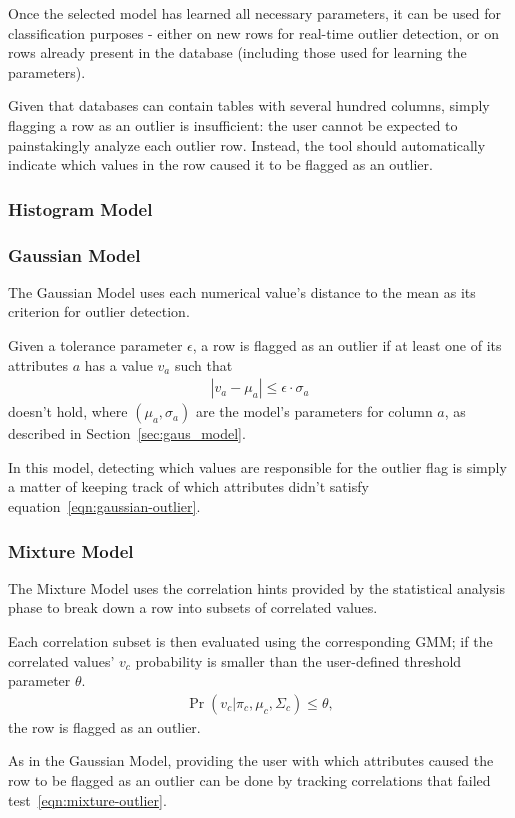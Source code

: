 Once the selected model has learned all necessary parameters, it can be used for classification purposes - either on new rows for real-time outlier detection, or on rows already present in the database (including those used for learning the parameters).

Given that databases can contain tables with several hundred columns, simply flagging a row as an outlier is insufficient: the user cannot be expected to painstakingly analyze each outlier row. Instead, the tool should automatically indicate which values in the row caused it to be flagged as an outlier.

\subsubsection{Histogram Model}
\subsubsection{Gaussian Model}
The Gaussian Model uses each numerical value's distance to the mean as its criterion for outlier detection. 

Given a tolerance parameter $\epsilon$, a row is flagged as an outlier if at least one of its attributes $a$ has a value $v_a$ such that 
\begin{align}
  |v_a - \mu_a| \leq \epsilon \cdot \sigma_a
  \label{eqn:gaussian-outlier}
\end{align}
doesn't hold, where $(\mu_a, \sigma_a)$ are the model's parameters for column $a$, as described in Section~\ref{sec:gaus_model}.

In this model, detecting which values are responsible for the outlier flag is simply a matter of keeping track of which attributes didn't satisfy equation~\ref{eqn:gaussian-outlier}.
 
\subsubsection{Mixture Model}
The Mixture Model uses the correlation hints provided by the statistical analysis phase to break down a row into subsets of correlated values.

Each correlation subset is then evaluated using the corresponding GMM; if the correlated values' $v_c$ probability is smaller than the user-defined threshold parameter $\theta$.
\begin{align}
  \Pr(v_c | \pi_c, \mu_c, \Sigma_c) \leq \theta, 
  \label{eqn:mixture-outlier}
\end{align}
the row is flagged as an outlier.

As in the Gaussian Model, providing the user with which attributes caused the row to be flagged as an outlier can be done by tracking correlations that failed test~\ref{eqn:mixture-outlier}.

